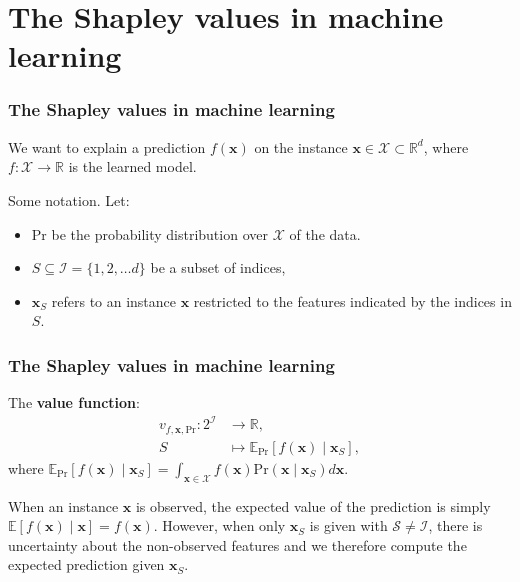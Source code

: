 \documentclass{beamer}
\begin{document}
\section{The Shapley values in machine learning}


\begin{frame}
\frametitle{The Shapley values in machine learning}

We want to explain a prediction $f(\bm{x})$ on the instance $\bm{x}\in\mathcal{X}\subset\mathbb{R}^d$, where $f:\mathcal{X}\to\mathbb{R}$ is the learned model.
\begin{figure}
  \centering
    \end{figure}

\pause
Some notation. Let:
\begin{itemize}
\item $\text{Pr}$ be the probability distribution over $\mathcal{X}$ of the data.
\pause
\item $S\subseteq \mathcal{I}=\{1,2,\dots d\}$ be a subset of indices,
\pause
\item $\bm{x}_S$ refers to an instance $\bm{x}$ restricted to the features indicated by the indices in $S$.
\end{itemize}

\end{frame}

\begin{frame}
  \frametitle{The Shapley values in machine learning}
The \textbf{value function}:
\begin{equation}
  \begin{aligned}
    v_{f,\bm{x},\text{Pr}}: 2^{\mathcal{I}} &\to \mathbb{R},\\
    S &\mapsto \mathbb{E}_\text{Pr}[f(\bm{x})\mid \bm{x}_S],
  \end{aligned}
\end{equation}
where $\mathbb{E}_{\text{Pr}}[f(\bm{x}) \mid \bm{x}_S] = \int_{\bm{x} \in \mathcal{X}}f(\bm{x})\text{Pr}(\bm{x} \mid \bm{x}_S)d\bm{x}$.
\vspace{1cm}

When an instance $\bm{x}$ is observed, the expected value of the prediction is simply $\mathbb{E}[f(\bm{x}) \mid \bm{x}] = f(\bm{x})$. However, when only $\bm{x}_S$ is given with $\mathcal{S} \neq \mathcal{I}$, there is uncertainty about the non-observed features and we therefore compute the expected prediction given $\bm{x}_S$.
\end{frame}
\end{document}
